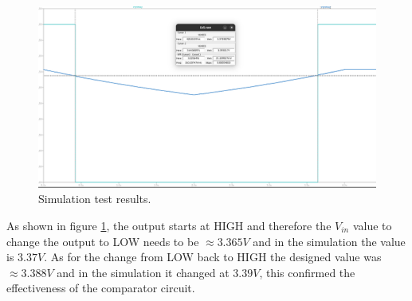 \begin{figure}[H]
    \centering
    \includegraphics*[scale = 0.25]{Images/CompSimRes.png}
    \caption{Simulation test results.}
    \label{fig:TestRes}
\end{figure}

As shown in figure \ref{fig:TestRes}, the output starts at HIGH and therefore the $V_{in}$ value to change the output to LOW needs to be $\approx 3.365V$ and in the simulation the value is $3.37V$. As for the change from LOW back to HIGH the designed value was $\approx 3.388V$ and in the simulation it changed at $3.39V$, this confirmed the effectiveness of the comparator circuit.


